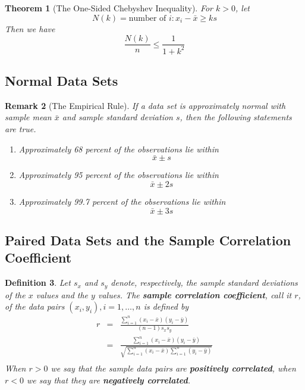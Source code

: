 \documentclass[12pt]{article}
\newtheorem{theorem}{Theorem}
\newtheorem{definition}[theorem]{Definition}
\newtheorem{remark}[theorem]{Remark}
\begin{document}
\begin{theorem}[The One-Sided Chebyshev Inequality]
  For $k>0$, let
  \begin{equation*}
    N(k) = \text{number of } i: x_i - \bar{x} \ge ks
  \end{equation*}
  Then we have
  \begin{equation*}
    \frac{N(k)}{n} \le \frac{1}{1+k^2}
  \end{equation*}
\end{theorem}

\subsection{Normal Data Sets}

\begin{remark} [The Empirical Rule]
  If a data set is approximately normal with sample mean $\bar{x}$ and sample standard deviation $s$, then the following statements are true.
  \begin{enumerate}
    \item Approximately 68 percent of the observations lie within
      \begin{equation*}
        \bar{x} \pm s
      \end{equation*}
    \item Approximately 95 percent of the observations lie within
      \begin{equation*}
        \bar{x} \pm 2s
      \end{equation*}
    \item Approximately 99.7 percent of the observations lie within
      \begin{equation*}
        \bar{x} \pm 3s
      \end{equation*}
  \end{enumerate}
\end{remark}

\subsection{Paired Data Sets and the Sample Correlation Coefficient}

\begin{definition}
  Let $s_x$ and $s_y$ denote, respectively, the sample standard deviations of the $x$ values and the $y$ values. The \textbf{sample correlation coefficient}, call it $r$, of the data pairs $(x_i,y_i),i=1,\dots,n$ is defined by
  \begin{eqnarray*}
    r
    &=& \frac {\sum_{i=1}^n (x_i - \bar{x})(y_i - \bar{y})}{(n-1) s_x s_y} \\
    &=& \frac {\sum_{i=1}^n (x_i - \bar{x})(y_i - \bar{y})}
    { \sqrt{\sum_{i=1}^n (x_i - \bar{x}) \sum_{i=1}^n (y_i - \bar{y})} } \\
  \end{eqnarray*}
  When $r > 0$ we say that the sample data pairs are \textbf{positively correlated}, when $r<0$ we say that they are \textbf{negatively correlated}.
\end{definition}
\end{document}

